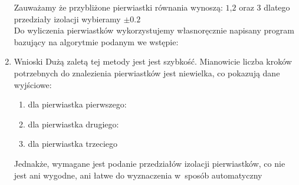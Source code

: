 \documentclass[12pt,a4paper]{article}
\begin{document}
\begin{enumerate}
\begin{figure}
\end{figure}
Zauważamy że przybliżone pierwiastki równania wynoszą: $1$,$2$ oraz $3$ dlatego przedziały izolacji wybieramy $\pm0.2$\\
Do wyliczenia pierwiastków wykorzystujemy własnoręcznie napisany program bazujący na algorytmie podanym we wstępie:

\item Wnioski
Dużą zaletą tej metody jest jest szybkość. Mianowicie liczba kroków potrzebnych do znalezienia pierwiastków jest niewielka, co pokazują dane wyjściowe:
\begin{enumerate}
\item dla pierwiastka pierwszego:

\item dla pierwiastka drugiego:

\item dla pierwiastka trzeciego

\end{enumerate}
Jednakże, wymagane jest podanie przedziałów izolacji pierwiastków, co nie jest ani wygodne, ani łatwe do wyznaczenia w~sposób automatyczny
\end{enumerate}
\end{document}
